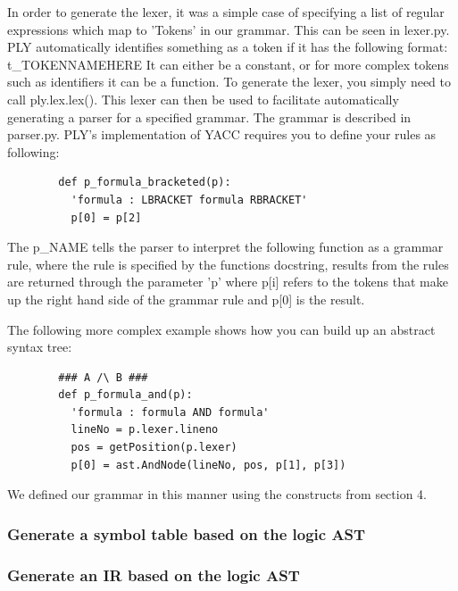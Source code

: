 \documentclass[a4paper, 11pt]{article}
\begin{document}
      In order to generate the lexer, it was a simple case of specifying a list
      of regular expressions which map to 'Tokens' in our grammar. This can be
      seen in lexer.py. PLY automatically identifies something as a token if it
      has the following format: 
        t\_TOKENNAMEHERE
      It can either be a constant, or for more complex tokens such as
      identifiers it can be a function. To generate the lexer, you simply need to
      call ply.lex.lex(). This lexer can then be used to facilitate
      automatically generating a parser for a specified grammar. The grammar is
      described in parser.py. PLY's implementation of YACC requires you to
      define your rules as following:
      \begin{verbatim}
        def p_formula_bracketed(p):
          'formula : LBRACKET formula RBRACKET'
          p[0] = p[2]
      \end{verbatim}
      The p\_NAME tells the parser to interpret the following function as a
      grammar rule, where the rule is specified by the functions docstring,
      results from the rules are returned through the parameter 'p' where p[i]
      refers to the tokens that make up the right hand side of the grammar rule
      and p[0] is the result.

      The following more complex example shows how you can build up an abstract
      syntax tree:

      \begin{verbatim}
        ### A /\ B ###
        def p_formula_and(p):
          'formula : formula AND formula'
          lineNo = p.lexer.lineno
          pos = getPosition(p.lexer)
          p[0] = ast.AndNode(lineNo, pos, p[1], p[3])
       \end{verbatim}

       We defined our grammar in this manner using the constructs from section 4.


    \subsubsection{Generate a symbol table based on the logic AST}


    \subsubsection{Generate an IR based on the logic AST}
\end{document}
